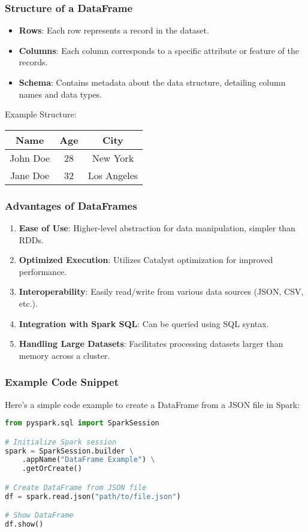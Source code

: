 \documentclass[aspectratio=169]{beamer}
\begin{document}
\begin{frame}[fragile]
    \frametitle{Structure of a DataFrame}
    \begin{itemize}
        \item \textbf{Rows}: Each row represents a record in the dataset.
        \item \textbf{Columns}: Each column corresponds to a specific attribute or feature of the records.
        \item \textbf{Schema}: Contains metadata about the data structure, detailing column names and data types.
    \end{itemize}
    \begin{center}
        Example Structure: \\
        \begin{tabular}{|c|c|c|}
            \hline
            \textbf{Name} & \textbf{Age} & \textbf{City} \\
            \hline
            John Doe & 28 & New York \\
            Jane Doe & 32 & Los Angeles \\
            \hline
        \end{tabular}
    \end{center}
\end{frame}

\begin{frame}[fragile]
    \frametitle{Advantages of DataFrames}
    \begin{enumerate}
        \item \textbf{Ease of Use}: Higher-level abstraction for data manipulation, simpler than RDDs.
        \item \textbf{Optimized Execution}: Utilizes Catalyst optimization for improved performance.
        \item \textbf{Interoperability}: Easily read/write from various data sources (JSON, CSV, etc.).
        \item \textbf{Integration with Spark SQL}: Can be queried using SQL syntax.
        \item \textbf{Handling Large Datasets}: Facilitates processing datasets larger than memory across a cluster.
    \end{enumerate}
\end{frame}

\begin{frame}[fragile]
    \frametitle{Example Code Snippet}
    Here’s a simple code example to create a DataFrame from a JSON file in Spark:
    \begin{lstlisting}[language=Python]
from pyspark.sql import SparkSession

# Initialize Spark session
spark = SparkSession.builder \
    .appName("DataFrame Example") \
    .getOrCreate()

# Create DataFrame from JSON file
df = spark.read.json("path/to/file.json")

# Show DataFrame
df.show()
    \end{lstlisting}
\end{frame}
\end{document}
